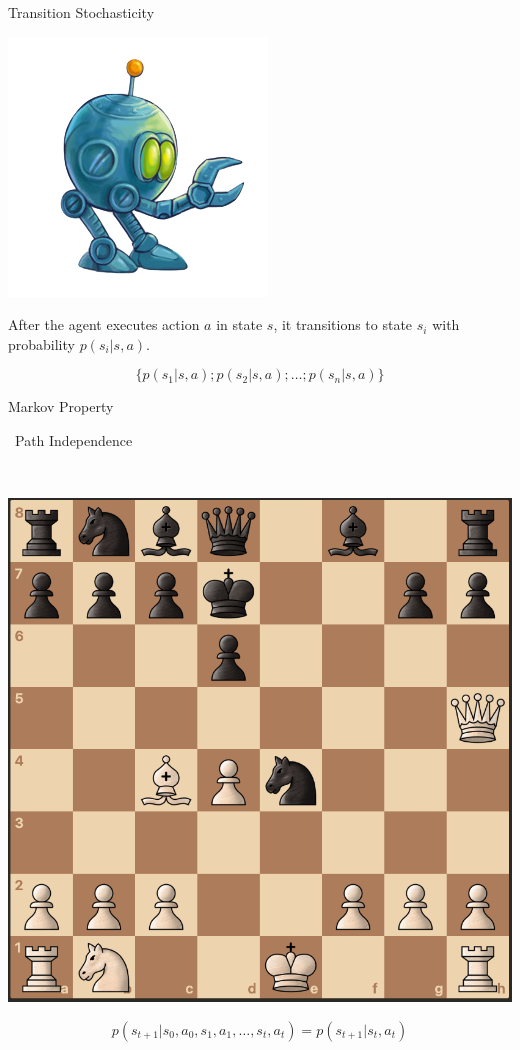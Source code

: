 \documentclass[11pt]{beamer}
\begin{document}
\begin{frame}{Transition Stochasticity}

\begin{minipage}{.3\linewidth}
\includegraphics[width=.95\linewidth]{images/robot}
\end{minipage}\hspace{.05\linewidth}\begin{minipage}{.6\linewidth}

After the agent executes action $a$ in state $s$, it transitions to state $s_i$ with probability $p(s_i | s, a)$.

\begin{center}
\[
\{p(s_1 | s, a); p(s_2 | s, a); \ldots; p(s_n | s, a)\}
\]

\end{center}
\end{minipage}

\end{frame}

\begin{frame}{Markov Property}

\HandRight\ Path Independence

\

\begin{center}
\includegraphics[width=.3\linewidth]{images/ajedrez}
\end{center}

\[
p(s_{t+1} | s_0, a_0, s_1, a_1, \ldots, s_t, a_t) = p(s_{t+1} | s_t, a_t)
\]

\end{frame}
\end{document}
